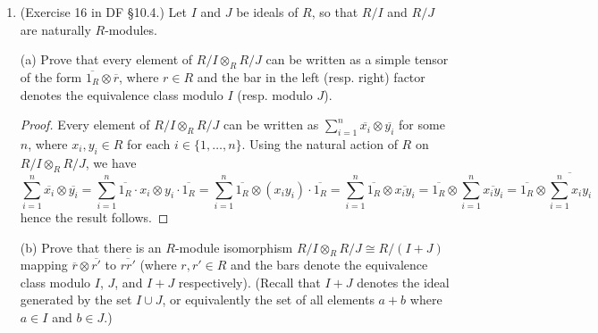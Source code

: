 \documentclass[10pt]{article}
\renewcommand{\bar}{\overline}
\begin{document}
\begin{enumerate}
\begin{proof}
Next, let $\prod m_i \otimes n_i \in \oplus_{i \in I} (M \otimes_R N_i)$, where $m_i \in M, n_i \in N_i$ for each $i \in I$.  We have
\begin{align*}
\varphi \circ \psi \left( \prod m_i \otimes n_i \right)
&=
\varphi \circ \psi \left( \sum_{\{ i : m_i \otimes n_i \neq 0 \}} \hat{\iota}_i(m_i \otimes n_i) \right)
\\
&= \varphi \left( \sum_{\{ i : m_i \otimes n_i \neq 0 \}} \psi_i(m_i \otimes n_i) \right)
\\
&= \varphi \left( \sum_{\{ i : m_i \otimes n_i \neq 0 \}} m_i \otimes \iota_i(n_i) \right)
\\
&= \sum_{\{ i : m_i \otimes n_i \neq 0 \}} \varphi \left( m_i \otimes \iota_i(n_i) \right)
\\
&= \sum_{\{ i : m_i \otimes n_i \neq 0 \}} \hat{\iota}_i \left( \prod m_i \otimes n_i \right)
\\
&= \prod m_i \otimes n_i
\end{align*}
therefore $\psi$ is also a right inverse of $\varphi$, so $\varphi$ is an isomorphism.
\end{proof}

\item (Exercise 16 in DF \S 10.4.) Let $I$ and $J$ be ideals of $R$, so that $R/I$ and $R/J$ are naturally $R$-modules.

(a) Prove that every element of $R/I \otimes_R R/J$ can be written as a simple tensor of the form $\overline{1_R} \otimes \overline{r}$, where $r \in R$ and the bar in the left (resp. right) factor denotes the equivalence class modulo $I$ (resp. modulo $J$).

\begin{proof}
Every element of $R/I \otimes_R R/J$ can be written as $\sum_{i=1}^n \bar{x_i} \otimes \bar{y_i}$ for some $n$, where $x_i, y_i \in R$ for each $i \in \{1, \dots , n \}$.  Using the natural action of $R$ on $R/I \otimes_R R/J$, we have
$$
\sum_{i=1}^n \bar{x_i} \otimes \bar{y_i} = \sum_{i=1}^n \bar{1_R} \cdot x_i \otimes y_i \cdot \bar{1_R} = \sum_{i=1}^n \bar{1_R} \otimes (x_iy_i) \cdot \bar{1_R} = \sum_{i=1}^n \bar{1_R} \otimes \bar{x_i y_i} = \bar{1_R} \otimes \sum_{i=1}^n  \bar{x_i y_i} = \bar{1_R} \otimes \bar{\sum_{i=1}^n  x_i y_i}
$$
hence the result follows.
\end{proof}

(b) Prove that there is an $R$-module isomorphism $R/I \otimes_R R/J \cong R/(I+J)$ mapping $\overline{r} \otimes \overline{r'}$ to $\overline{rr'}$ (where $r, r' \in R$ and the bars denote the equivalence class modulo $I$, $J$, and $I+J$ respectively).  (Recall that $I+J$ denotes the ideal generated by the set $I \cup J$, or equivalently the set of all elements $a+b$ where $a \in I$ and $b \in J$.)


\end{enumerate}
\end{document}
